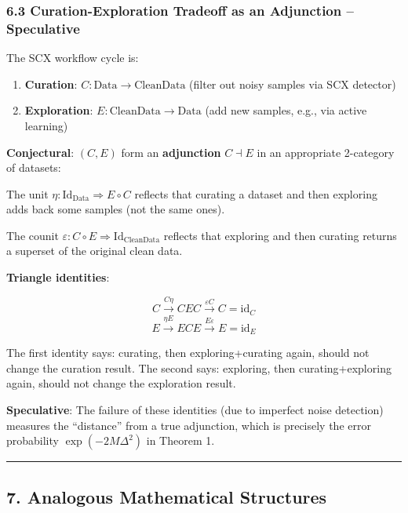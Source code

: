 \documentclass[
  12pt,
]{article}
\providecommand{\tightlist}{%
  \setlength{\itemsep}{0pt}\setlength{\parskip}{0pt}}
\begin{document}
\subsubsection{6.3 Curation-Exploration Tradeoff as an Adjunction --
Speculative}\label{curation-exploration-tradeoff-as-an-adjunction-speculative}

The SCX workflow cycle is:

\begin{enumerate}
\def\labelenumi{\arabic{enumi}.}
\tightlist
\item
  \textbf{Curation}: \(C: \text{Data} \to \text{CleanData}\) (filter out
  noisy samples via SCX detector)
\item
  \textbf{Exploration}: \(E: \text{CleanData} \to \text{Data}\) (add new
  samples, e.g., via active learning)
\end{enumerate}

\textbf{Conjectural}: \((C, E)\) form an \textbf{adjunction}
\(C \dashv E\) in an appropriate 2-category of datasets:

The unit \(\eta: \text{Id}_{\text{Data}} \Rightarrow E \circ C\)
reflects that curating a dataset and then exploring adds back some
samples (not the same ones).

The counit
\(\varepsilon: C \circ E \Rightarrow \text{Id}_{\text{CleanData}}\)
reflects that exploring and then curating returns a superset of the
original clean data.

\textbf{Triangle identities}:

\[C \xrightarrow{C\eta} CEC \xrightarrow{\varepsilon C} C = \text{id}_C\]
\[E \xrightarrow{\eta E} ECE \xrightarrow{E\varepsilon} E = \text{id}_E\]

The first identity says: curating, then exploring+curating again, should
not change the curation result. The second says: exploring, then
curating+exploring again, should not change the exploration result.

\textbf{Speculative}: The failure of these identities (due to imperfect
noise detection) measures the ``distance'' from a true adjunction, which
is precisely the error probability \(\exp(-2M\Delta^2)\) in Theorem 1.

\begin{center}\rule{0.5\linewidth}{0.5pt}\end{center}

\subsection{7. Analogous Mathematical
Structures}\label{analogous-mathematical-structures}
\end{document}
